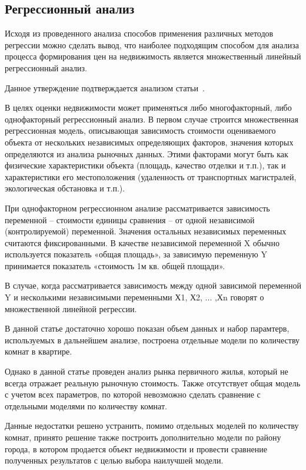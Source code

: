 \subsection{Регрессионный анализ}
\label{sec:analogues:regression}

Исходя из проведенного анализа способов применения различных методов регрессии можно сделать вывод, что наиболее
подходящим способом для анализа процесса формирования цен на недвижимость является множественный линейный регрессионный
анализ.

Данное утверждение подтверждается анализом статьи~\cite{using_regression_analysis}.

В целях оценки недвижимости может применяться либо многофакторный, либо однофакторный регрессионный анализ.
В первом случае строится множественная регрессионная модель, описывающая зависимость стоимости оцениваемого объекта от
нескольких независимых определяющих факторов, значения которых определяются из анализа рыночных данных.
Этими факторами могут быть как физические характеристики объекта (площадь, качество отделки и т.п.), так и
характеристики его местоположения (удаленность от транспортных магистралей, экологическая обстановка и т.п.).

При однофакторном регрессионном анализе рассматривается зависимость переменной – стоимости единицы сравнения – от одной
независимой (контролируемой) переменной. Значения остальных независимых переменных считаются фиксированными.
В качестве независимой переменной X обычно используется показатель «общая площадь», за зависимую переменную Y
принимается показатель «стоимость 1м кв. общей площади».

В случае, когда рассматривается зависимость между одной зависимой переменной Y и несколькими независимыми
переменными Х1, Х2, ... ,Хn говорят о множественной линейной регрессии. 

В данной статье достаточно хорошо показан объем данных и набор парамтерв, используемых в дальнейшем анализе, построена
отдельные модели по количеству комнат в квартире.

Однако в данной статье проведен анализ рынка первичного жилья, который не всегда отражает реальную рыночную стоимость.
Также отсутствует общая модель с учетом всех параметров, по которой невозможно сделать сравнение с отдельными моделями
по количеству комнат.

Данные недостатки решено устранить, помимо отдельных моделей по количеству комнат, принято решение также построить
дополнительно модели по району города, в котором продается объект недвижимости и провести сравнение полученных результатов
с целью выбора наилучшей модели.
